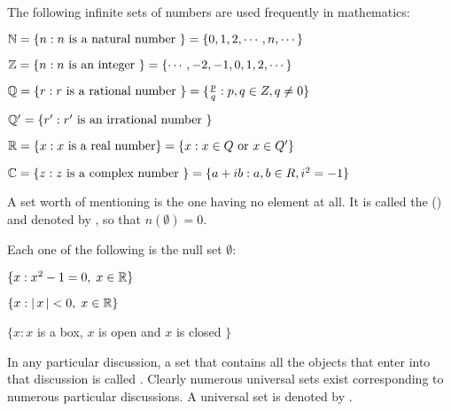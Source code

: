 \documentclass[11pt]{amsbook}
\begin{document}
\begin{exmp} 
	The following infinite sets of numbers are used 
	frequently in mathematics:
	\begin{hEnumerateArabic}
		
		\item  
		$\mathbb{N} 
		= \{ n: n \text{ is a natural number } \} 
		= \{ 0, 1, 2, \cdots, n, \cdots \}$
		
		\item  
		$\mathbb{Z} 
		= \{n: n \text{ is an integer } \} 
		= \{ \cdots, -2, -1, 0, 1, 2, \cdots \}$
		
		\item  
		$\mathbb{Q} 
		= \{ r: r \text{ is a rational number } \} 
		= \{ \frac{p}{q} : p,  q \in Z, q \ne 0 \}$
		
		\item
		$\mathbb{Q}'  
		= \{ r' : r' \text{ is an irrational number } \}$
		
		\item  
		$\mathbb{R} 
		= \{ x: x \text{ is a real number} \} 
		= \{ x: x \in Q \text{ or } x \in Q' \}$
		
		\item  
		$\mathbb{C} 
		= \{ z: z \text{ is a complex number } \} 
		= \{ a+ i b: a, b \in R  , i^{2}=-1\}$
	\end{hEnumerateArabic}
\end{exmp}

A  set worth of mentioning is the one having no element at all. 
It is called the  () and 
denoted by \hDefinedN{$\emptyset$}, 
so that $n(\emptyset) = 0$.

\begin{exmp} 
	Each one of the following is the null set $\emptyset$:
	\begin{hEnumerateArabic}
		
		\item 
		$\{ x : x^{2} - 1 = 0, \; x \in \mathbb{R} \}$
		
		\item 
		$\{ x : \left \lvert \, x \, \right \rvert < 0, \; x \in \mathbb{R} \}$
		
		\item 
		$\{ x : x$ is a box, $x$ is open and $x$ is closed $\}$
	\end{hEnumerateArabic}
\end{exmp}

In any particular discussion, 
a set that contains all the objects that enter into that discussion 
is called  . 
Clearly numerous universal sets exist corresponding to 
numerous particular discussions. 
A universal set is denoted by .
\end{document}
